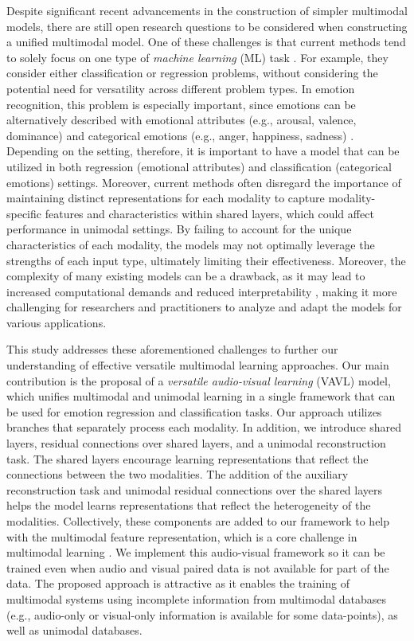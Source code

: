 \documentclass{article}
\begin{document}
Despite significant recent advancements in the construction of simpler multimodal models, there are still open research questions to be considered when constructing a unified multimodal model. One of these challenges is that current methods tend to solely focus on one type of \emph{machine learning} (ML) task \cite{Baltrusaitis_2019}. For example, they consider either classification or regression problems, without considering the potential need for versatility across different problem types. In emotion recognition, this problem is especially important, since emotions can be alternatively described with emotional attributes (e.g., arousal, valence, dominance) and categorical emotions (e.g., anger, happiness, sadness) \cite{ElAyadi_2011}. Depending on the setting, therefore, it is important to have a model that can be utilized in both regression (emotional attributes) and classification (categorical emotions) settings. Moreover, current methods often disregard the importance of maintaining distinct representations for each modality to capture modality-specific \cite{Zadeh_2018_2} features and characteristics within shared layers, which could affect performance in unimodal settings\cite{Ngiam_2011}. By failing to account for the unique characteristics of each modality, the models may not optimally leverage the strengths of each input type, ultimately limiting their effectiveness. Moreover, the complexity of many existing models can be a drawback, as it may lead to increased computational demands and reduced interpretability \cite{agrawal_2016}, making it more challenging for researchers and practitioners to analyze and adapt the models for various applications.

This study addresses these aforementioned challenges to further our understanding of effective versatile multimodal learning approaches. Our main contribution is the proposal of a \emph{versatile audio-visual learning} (VAVL) model, which unifies multimodal and unimodal learning in a single framework that can be used for emotion regression and classification tasks. Our approach utilizes branches that separately process each modality. In addition, we introduce shared layers, residual connections over shared layers, and a unimodal reconstruction task. The shared layers encourage learning representations that reflect the connections between the two modalities. The addition of the auxiliary reconstruction task and unimodal residual connections over the shared layers helps the model learns representations that reflect the heterogeneity of the modalities.  Collectively, these components are added to our framework to help with the multimodal feature representation, which is a core challenge in multimodal learning \cite{Liang_2022}. We implement this audio-visual framework so it can be trained even when audio and visual paired data is not available for part of the data. The proposed approach is attractive as it enables the training of multimodal systems using incomplete information from multimodal databases (e.g., audio-only or visual-only information is available for some data-points), as well as unimodal databases.
\end{document}
